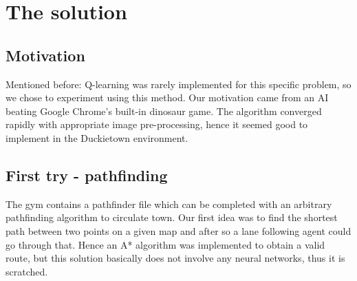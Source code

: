 \documentclass{article}
\begin{document}
\newpage
\section{The solution}
\subsection{Motivation}
Mentioned before: Q-learning was rarely implemented for this specific problem, 
so we chose to experiment using this method. Our motivation came from an AI 
beating Google Chrome's built-in dinosaur game.  The algorithm converged rapidly 
with appropriate image pre-processing, hence it seemed good to implement in the 
Duckietown environment.
\subsection{First try - pathfinding}
The gym contains a pathfinder file which can be completed with an arbitrary pathfinding algorithm
to circulate town. \cite{gym_duckietown}
Our first idea was to find the shortest path between two points on a given map and after
so a lane following agent could go through that. Hence an A* algorithm\cite{4082128} was implemented
to obtain a valid route, but this solution basically does not involve any neural networks, thus
it is scratched.
\end{document}
